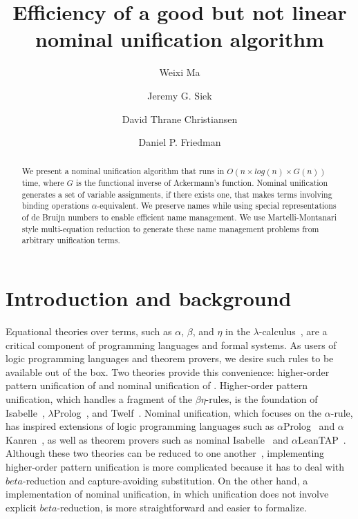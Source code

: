\documentclass[a4paper,UKenglish]{lipics-v2016}
\title{Efficiency of a good but not linear nominal unification algorithm}
\author[1]{Weixi Ma}
\author[2]{Jeremy G. Siek}
\author[3]{David Thrane Christiansen}
\author[4]{Daniel P. Friedman}
\affil[1]{Indiana University,
  \texttt{mvc@iu.edu}}
\affil[2]{Indiana University,
  \texttt{jsiek@indiana.edu}}
\affil[3]{Galois, Inc.,
  \texttt{dtc@galois.com}}
\affil[4]{Indiana University,
  \texttt{dfried@indiana.edu}}
\begin{document}
\maketitle

\begin{abstract}
  We present a nominal unification algorithm that runs in $O(n \times
  log(n) \times G(n))$ time, where $G$ is the functional inverse of
  Ackermann's function.  Nominal unification generates a set of
  variable assignments, if there exists one, that makes terms
  involving binding operations $\alpha$-equivalent. We preserve names
  while using special representations of de Bruijn numbers
  to enable efficient name management.
  We use Martelli-Montanari style multi-equation reduction
  to generate these name management problems from arbitrary unification terms.
\end{abstract}

\section{Introduction and background}

Equational theories over terms, such as $\alpha$, $\beta$, and $\eta$
in the $\lambda$-calculus~\citep{church_calculi_1941}, are
a critical component of
programming languages and formal systems.  As users of logic
programming languages and theorem provers, we desire such rules to be
available out of the box. Two theories provide
this convenience: higher-order pattern unification of
\citet{miller_logic_1989} and nominal unification of
\citet{urban_nominal_2004}. Higher-order pattern unification, which
handles a fragment of the $\beta\eta$-rules, is the foundation of
Isabelle~\citep{paulson_natural_1986},
$\lambda$Prolog~\citep{nadathur_overview_1988}, and
Twelf~\citep{pfenning_system_1999}.  Nominal unification, which
focuses on the $\alpha$-rule, has inspired extensions of logic
programming languages such as $\alpha$Prolog~\citep{cheney_prolog:_2004}
and $\alpha$Kanren~\citep{byrd_kanren_2007}, as well as theorem
provers such as nominal Isabelle~\citep{urban_nominal_2005} and
$\alpha$LeanTAP~\citep{near_leantap:_2008}.  Although these two
theories can be reduced to one another~\citep{cheney_relating_2005,
  levy_nominal_2012}, implementing higher-order pattern unification is
more complicated because it has to deal with $beta$-reduction and
capture-avoiding substitution. On the other hand, a implementation of
nominal unification,
in which unification does not involve explicit $beta$-reduction,
is more straightforward and easier to formalize.
\end{document}
